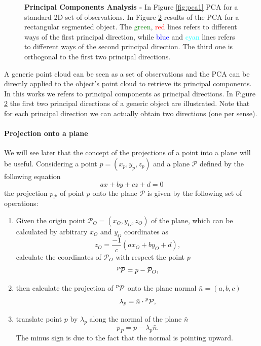 \begin{figure}[h]
\begin{subfigure}[t]{0.45\textwidth}
\caption{}\label{fig:pca2}
\end{subfigure}
\caption{\textbf{Principal Components Analysis -} In Figure \ref{fig:pca1} PCA for a standard 2D set of observations. In Figure \ref{fig:pca2} results of the PCA for a rectangular segmented object. The \textcolor{green}{green}, \textcolor{red}{red} lines refers to different ways of the first principal direction, while \textcolor{blue}{blue} and \textcolor{cyan}{cyan} lines refers to different ways of the second principal direction. The third one is orthogonal to the first two principal directions.}
\end{figure}

A generic point cloud can be seen as a set of observations and the PCA can be directly applied to the object's point cloud to retrieve its principal components. In this works we refers to principal components as principal directions. In Figure \ref{fig:pca2} the first two principal directions of a generic object are illustrated. Note that for each principal direction we can actually obtain two directions (one per sense).

\paragraph{Projection onto a plane}
We will see later that the concept of the projections of a point into a plane will be useful. Considering a point $p=(x_p,y_p,z_p)$ and a plane $\mathcal{P}$ defined by the following equation
\begin{equation}
a x + by + cz + d = 0
\end{equation}
the projection $p_{\mathcal{P}}$ of point $p$ onto the plane $\mathcal{P}$ is given by the following set of operations:
\begin{enumerate}
\item Given the origin point $\mathcal{P}_O=(x_O,y_O,z_O)$ of the plane, which can be calculated by arbitrary $x_O$ and $y_O$ coordinates as
\[
z_O = \frac{-1}{c}(ax_O + by_O + d),
\]
calculate the coordinates of $\mathcal{P}_O$ with respect the point $p$
\[
\mathcal{\prescript{p}{}P} = p - \mathcal{P}_O,
\]
\item then calculate the projection of $\mathcal{\prescript{p}{}P}$ onto the plane normal $\bar{n}=(a,b,c)$
\[
\lambda_p = \bar{n} \cdot \mathcal{\prescript{p}{}P}, 
\]
\item translate point $p$ by $\lambda_p$ along the normal of the plane $\bar{n}$
\[
p_P = p - \lambda_p \bar{n}. 
\]
The minus sign is due to the fact that the normal is pointing upward.
\end{enumerate}

